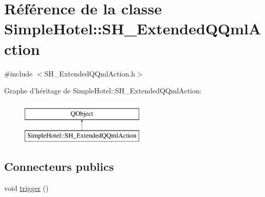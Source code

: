 \hypertarget{classSimpleHotel_1_1SH__ExtendedQQmlAction}{\section{Référence de la classe Simple\-Hotel\-:\-:S\-H\-\_\-\-Extended\-Q\-Qml\-Action}
\label{classSimpleHotel_1_1SH__ExtendedQQmlAction}
}


{\ttfamily \#include $<$S\-H\-\_\-\-Extended\-Q\-Qml\-Action.\-h$>$}

Graphe d'héritage de Simple\-Hotel\-:\-:S\-H\-\_\-\-Extended\-Q\-Qml\-Action\-:\begin{figure}[H]
\begin{center}
\leavevmode
\includegraphics[height=2.000000cm]{classSimpleHotel_1_1SH__ExtendedQQmlAction}
\end{center}
\end{figure}
\subsection*{Connecteurs publics}
\begin{DoxyCompactItemize}
\item 
void \hyperlink{classSimpleHotel_1_1SH__ExtendedQQmlAction_ac7d4cb7950d71bad70dfe0fd3930f7f8}{trigger} ()
\end{DoxyCompactItemize}
